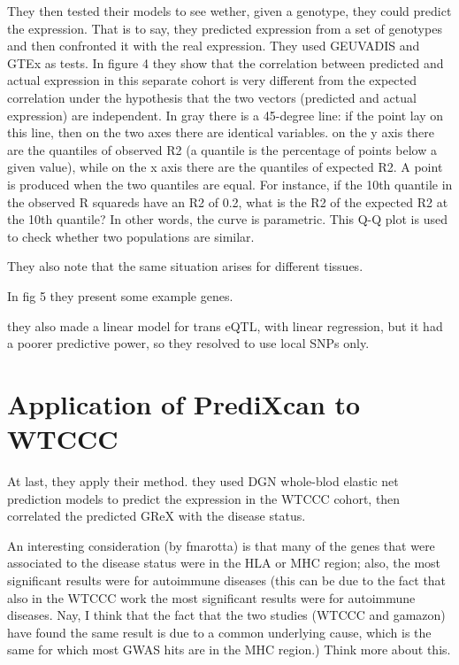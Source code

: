 \documentclass[../main.tex]{subfiles}
\begin{document}
They then tested their models to see wether, given a genotype, they 
could predict the expression. That is to say, they predicted expression 
from a set of genotypes and then confronted it with the real expression. 
They used GEUVADIS and GTEx as tests. In figure 4 they show that the 
correlation between predicted and actual expression in this separate 
cohort is very different from the expected correlation under the 
hypothesis that the two vectors (predicted and actual expression) are 
independent. In gray there is a 45-degree line: if the point lay on this 
line, then on the two axes there are identical variables. on the y axis 
there are the quantiles of observed R2 (a quantile is the percentage of 
points below a given value), while on the x axis there are the quantiles 
of expected R2. A point is produced when the two quantiles are equal. 
For instance, if the 10th quantile in the observed R squareds have an R2 
of 0.2, what is the R2 of the expected R2 at the 10th quantile? In other 
words, the curve is parametric. This Q-Q plot is used to check whether 
two populations are similar.

They also note that the same situation arises for different tissues.

In fig 5 they present some example genes.

they also made a linear model for trans eQTL, with linear regression, 
but it had a poorer predictive power, so they resolved to use local SNPs 
only.

\section{Application of PrediXcan to WTCCC}

At last, they apply their method. they used DGN whole-blod elastic net 
prediction models to predict the expression in the WTCCC cohort, then 
correlated the predicted GReX with the disease status.

An interesting consideration (by fmarotta) is that many of the genes 
that were associated to the disease status were in the HLA or MHC 
region; also, the most significant results were for autoimmune diseases 
(this can be due to the fact that also in the WTCCC work the most 
significant results were for autoimmune diseases. Nay, I think that the 
fact that the two studies (WTCCC and gamazon) have found the same result 
is due to a common underlying cause, which is the same for which most 
GWAS hits are in the MHC region.) Think more about this.
\end{document}
